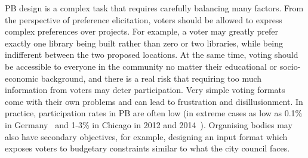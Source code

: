 \documentclass{comsoc2023}
\begin{document}
 PB  design is a complex task that   requires carefully balancing many factors. From the perspective of preference elicitation,   voters should be allowed to express complex preferences over projects.  For example, a voter may greatly prefer exactly one library being built rather than zero or two libraries, while being indifferent between the two proposed locations. At the same time, voting should be accessible to everyone in the community no matter their educational or socio-economic background, and there is a real risk that requiring too much information from voters may deter   participation. 
Very simple voting formats   come with their own problems and can lead to frustration and disillusionment. %
In practice,   participation rates in PB are often low  (in extreme cases as low as 0.1\% in Germany~\citep{zepic2017participatory} and 1-3\%   in Chicago in 2012 and 2014~\citep{stewart2014participatory,carroll2016democratizing}). %
Organising bodies  may also have secondary objectives, for example, designing an input format which exposes voters to   budgetary constraints similar to what the city council faces.

\end{document}
